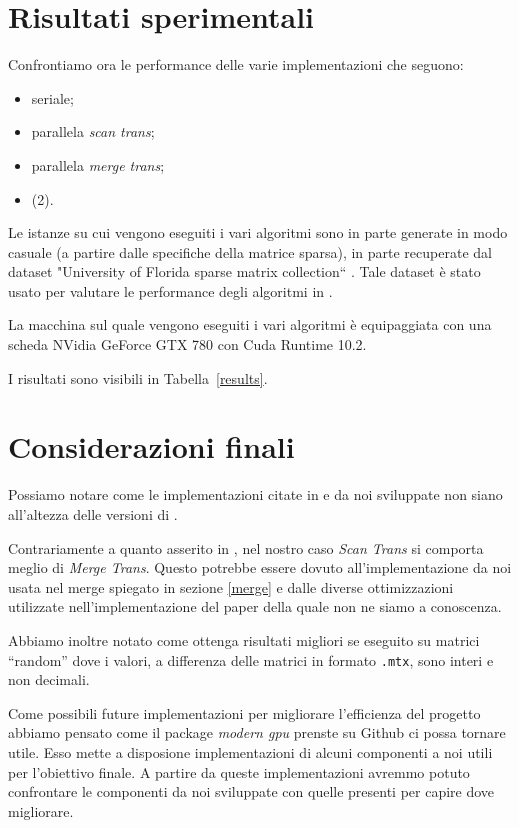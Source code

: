 

\section{Risultati sperimentali}

Confrontiamo ora le performance delle varie implementazioni che seguono:
\begin{itemize}
    \item seriale;
    \item parallela \emph{scan trans};
    \item parallela \emph{merge trans};
    \item \cuSPARSE (2).
\end{itemize}

Le istanze su cui vengono eseguiti i vari algoritmi sono in parte generate in modo casuale (a partire dalle specifiche della matrice sparsa), in parte recuperate dal dataset "University  of Florida sparse  matrix collection`` \cite{dataset}. Tale dataset è stato usato per valutare le performance degli algoritmi in \cite{parallelTrans}.

La macchina sul quale vengono eseguiti i vari algoritmi è equipaggiata con una scheda NVidia GeForce GTX 780 con Cuda Runtime 10.2.

I risultati sono visibili in Tabella~\ref{results}. 

\section{Considerazioni finali}\label{conclusioni}
Possiamo notare come le implementazioni citate in \cite{parallelTrans} e da noi sviluppate non siano all'altezza delle versioni di \cuSPARSE.

Contrariamente a quanto asserito in \cite{parallelTrans}, nel nostro caso \textit{Scan Trans} si comporta meglio di \textit{Merge Trans}. Questo potrebbe essere dovuto all'implementazione da noi usata nel merge spiegato in sezione \ref{merge} e dalle diverse ottimizzazioni utilizzate nell'implementazione del paper della quale non ne siamo a conoscenza.

Abbiamo inoltre notato come \ScanTrans ottenga risultati migliori se eseguito su matrici ``random'' dove i valori, a differenza delle matrici in formato \texttt{.mtx}, sono interi e non decimali.

Come possibili future implementazioni per migliorare l'efficienza del progetto abbiamo pensato come il package \textit{modern gpu} prenste su Github ci possa tornare utile. Esso mette a disposione implementazioni di alcuni componenti a noi utili per l'obiettivo finale. A partire da queste implementazioni avremmo potuto confrontare le componenti da noi sviluppate con quelle presenti per capire dove migliorare. 




